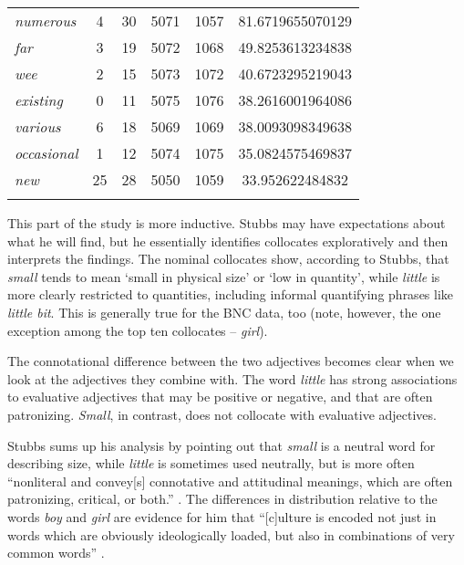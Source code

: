 \begin{table}[p]
{\begin{tabular}[t]{l S[table-format=3] S[table-format=1] S[table-format=4] S[table-format=4] S[table-format=3.2]}
\textit{numerous} & 4 & 30 & 5071 & 1057 & 81.6719655070129 \\
\textit{far} & 3 & 19 & 5072 & 1068 & 49.8253613234838 \\
\textit{wee} & 2 & 15 & 5073 & 1072 & 40.6723295219043 \\
\textit{existing} & 0 & 11 & 5075 & 1076 & 38.2616001964086 \\
\textit{various} & 6 & 18 & 5069 & 1069 & 38.0093098349638 \\
\textit{occasional} & 1 & 12 & 5074 & 1075 & 35.0824575469837 \\
\textit{new} & 25 & 28 & 5050 & 1059 & 33.952622484832 \\
\lspbottomrule
\end{tabular}}
\end{table}\clearpage

This part of the study is more inductive.  Stubbs may have expectations about what he will find, but he essentially identifies collocates  exploratively and then interprets the findings. The nominal  collocates show, according to Stubbs, that \textit{small} tends to mean `small in physical size' or `low in quantity', while \textit{little} is more clearly restricted to quantities, including informal quantifying phrases like \textit{little bit}. This is generally true for the BNC  data, too (note, however, the one exception among the top ten collocates  -- \textit{girl}).

The connotational  difference between the two adjectives  becomes clear when we look at the adjectives  they combine with. The word \textit{little} has strong associations  to evaluative adjectives  that may be positive or negative, and that are often patronizing. \textit{Small}, in contrast, does not collocate  with evaluative  adjectives.

Stubbs sums up his analysis by pointing out that \textit{small} is a neutral word for describing size, while \textit{little} is sometimes used neutrally, but is more often ``nonliteral and convey[s] connotative  and attitudinal meanings,  which are often patronizing, critical, or both.'' \citep[386]{stubbs_collocations_1995-1}. The differences in distribution  relative to the words \textit{boy} and \textit{girl} are evidence for him that ``[c]ulture is encoded not just in words which are obviously ideologically  loaded, but also in combinations of very common words'' \citep[387]{stubbs_collocations_1995-1}.

